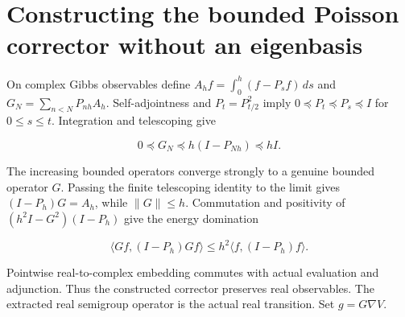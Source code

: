 \documentclass[11pt,a4paper]{report}
\begin{document}
\section{\texorpdfstring{Constructing the bounded Poisson corrector without an eigenbasis}{Constructing the bounded Poisson corrector without an eigenbasis}}


On complex Gibbs observables define
    \(A_hf=\int_0^h(f-P_sf)\,ds\) and
    \(G_N=\sum_{n<N}P_{nh}A_h\).
    Self-adjointness and \(P_t=P_{t/2}^2\) imply
    \(0\preccurlyeq P_t\preccurlyeq P_s\preccurlyeq I\) for
    \(0\le s\le t\). Integration and telescoping give


    \[0\preccurlyeq G_N\preccurlyeq h(I-P_{Nh})\preccurlyeq hI.\]


The increasing bounded operators converge strongly to a genuine
    bounded operator \(G\). Passing the finite telescoping identity to the
    limit gives \((I-P_h)G=A_h\), while
    \(\|G\|\le h\). Commutation and positivity of
    \((h^2I-G^2)(I-P_h)\) give the energy domination


    \[\langle Gf,(I-P_h)Gf\rangle
      \le h^2\langle f,(I-P_h)f\rangle.\]


Pointwise real-to-complex embedding commutes with actual evaluation
    and adjunction. Thus the constructed corrector preserves real
    observables. The extracted real semigroup operator is the actual real
    transition. Set \(g=G\nabla V\).
\end{document}

